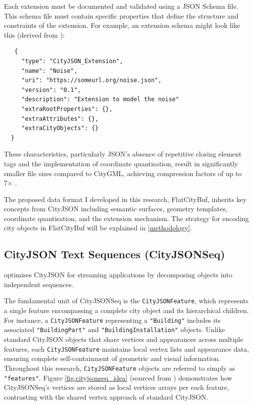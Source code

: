 Each extension must be documented and validated using a JSON Schema file. This schema file must contain specific properties that define the structure and constraints of the extension. For example, an extension schema might look like this (derived from \citet{ledoux_2019}):

\begin{lstlisting}
   {
     "type": "CityJSON_Extension",
     "name": "Noise",
     "uri": "https://someurl.org/noise.json",
     "version": "0.1",
     "description": "Extension to model the noise"
     "extraRootProperties": {},
     "extraAttributes": {},
     "extraCityObjects": {}
  }
\end{lstlisting}

These characteristics, particularly JSON's absence of repetitive closing element tags and the implementation of coordinate quantisation, result in significantly smaller file sizes compared to CityGML, achieving compression factors of up to 7× \citep{ledoux_2019}.

The proposed data format I developed in this research, FlatCityBuf, inherits key concepts from CityJSON including semantic surfaces, geometry templates, coordinate quantisation, and the extension mechanism. The strategy for encoding city objects in FlatCityBuf will be explained in \autoref{methodology}.

\subsection{CityJSON Text Sequences (CityJSONSeq)}
\label{rw:cityjson_enhancements:cityjsonseq}

\citet{ledoux_2024} optimises CityJSON for streaming applications by decomposing objects into independent sequences.

The fundamental unit of CityJSONSeq is the \texttt{CityJSONFeature}, which represents a single feature encompassing a complete city object and its hierarchical children. For instance, a \texttt{CityJSONFeature} representing a \texttt{"Building"} includes its associated \texttt{"BuildingPart"} and \texttt{"BuildingInstallation"} objects. Unlike standard CityJSON objects that share vertices and appearances across multiple features, each \texttt{CityJSONFeature} maintains local vertex lists and appearance data, ensuring complete self-containment of geometric and visual information. Throughout this research, \texttt{CityJSONFeature} objects are referred to simply as \texttt{"features"}. Figure \autoref{fig:cityjsonseq_idea} (sourced from \citet{ledoux_2024}) demonstrates how CityJSONSeq's vertices are stored as local vertices arrays per each feature, contrasting with the shared vertex approach of standard CityJSON.

